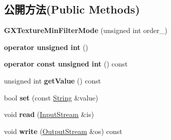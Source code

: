 \subsection*{公開方法(Public Methods)}
\begin{DoxyCompactItemize}
\item 
{\bfseries G\+X\+Texture\+Min\+Filter\+Mode} (unsigned int order\+\_)\hypertarget{class_i_dream_sky_1_1_g_x_texture_min_filter_mode_a86db50c49e8c14a93c8f23103281a53c}{}\label{class_i_dream_sky_1_1_g_x_texture_min_filter_mode_a86db50c49e8c14a93c8f23103281a53c}

\item 
{\bfseries operator unsigned int} ()\hypertarget{class_i_dream_sky_1_1_g_x_texture_min_filter_mode_a82a528401d5924016247427905fdfc19}{}\label{class_i_dream_sky_1_1_g_x_texture_min_filter_mode_a82a528401d5924016247427905fdfc19}

\item 
{\bfseries operator const unsigned int} () const \hypertarget{class_i_dream_sky_1_1_g_x_texture_min_filter_mode_ae1967cb8a64124b0ccfa2403a41e0d7c}{}\label{class_i_dream_sky_1_1_g_x_texture_min_filter_mode_ae1967cb8a64124b0ccfa2403a41e0d7c}

\item 
unsigned int {\bfseries get\+Value} () const \hypertarget{class_i_dream_sky_1_1_g_x_texture_min_filter_mode_aaf32b534f717884c80cf46be0fbca5cc}{}\label{class_i_dream_sky_1_1_g_x_texture_min_filter_mode_aaf32b534f717884c80cf46be0fbca5cc}

\item 
bool {\bfseries set} (const \hyperlink{class_i_dream_sky_1_1_string}{String} \&value)\hypertarget{class_i_dream_sky_1_1_g_x_texture_min_filter_mode_af6de205c0697dcb6bf551a2e36e1929c}{}\label{class_i_dream_sky_1_1_g_x_texture_min_filter_mode_af6de205c0697dcb6bf551a2e36e1929c}

\item 
void {\bfseries read} (\hyperlink{class_i_dream_sky_1_1_input_stream}{Input\+Stream} \&is)\hypertarget{class_i_dream_sky_1_1_g_x_texture_min_filter_mode_a2184f907e5eb1a19b9709c13b1cdda27}{}\label{class_i_dream_sky_1_1_g_x_texture_min_filter_mode_a2184f907e5eb1a19b9709c13b1cdda27}

\item 
void {\bfseries write} (\hyperlink{class_i_dream_sky_1_1_output_stream}{Output\+Stream} \&os) const \hypertarget{class_i_dream_sky_1_1_g_x_texture_min_filter_mode_ac72c0e8bbd218de021919e468f2acabc}{}\label{class_i_dream_sky_1_1_g_x_texture_min_filter_mode_ac72c0e8bbd218de021919e468f2acabc}

\end{DoxyCompactItemize}


